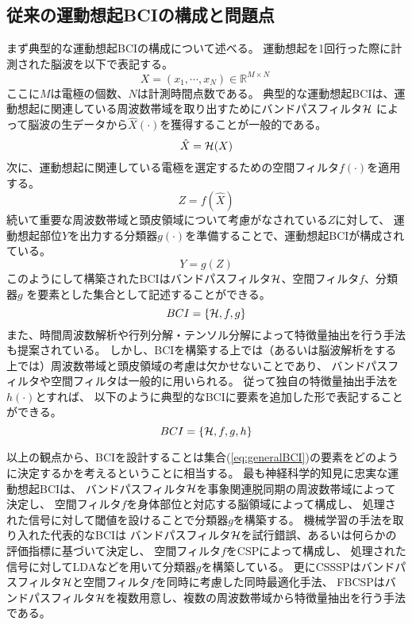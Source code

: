 \subsection{従来の運動想起BCIの構成と問題点}
まず典型的な運動想起BCIの構成について述べる。
運動想起を1回行った際に計測された脳波を以下で表記する。
\begin{equation}
    X =(x_1, \cdots, x_N)\in \mathbb{R}^{M \times N}\    
\end{equation}
ここに\(M\)は電極の個数、\(N\)は計測時間点数である。
典型的な運動想起BCIは、運動想起に関連している周波数帯域を取り出すためにバンドパスフィルタ\(\cal H\)
によって脳波の生データから\(\hat X(\cdot)\)を獲得することが一般的である。
\begin{equation}
    \hat X = {\cal H}(X)
    \label{eq:bandpass}
\end{equation}
次に、運動想起に関連している電極を選定するための空間フィルタ\(f(\cdot)\)を適用する。
\begin{equation}
    Z = f(\hat X)
    \label{eq:spatfilter}
\end{equation}
続いて重要な周波数帯域と頭皮領域について考慮がなされている\(Z\)に対して、
運動想起部位\(Y\)を出力する分類器\(g(\cdot)\)を準備することで、運動想起BCIが構成されている。
\begin{equation}
    Y = g(Z)
    \label{eq:classifier}
\end{equation}
このようにして構築されたBCIはバンドパスフィルタ\(\cal H\)、空間フィルタ\(f\)、分類器\(g\)
を要素とした集合として記述することができる。
\begin{equation}
    BCI=\{{\cal H},f,g\}
    \label{eq:BCI}
\end{equation}
また、時間周波数解析や行列分解・テンソル分解によって特徴量抽出を行う手法も提案されている。
しかし、BCIを構築する上では（あるいは脳波解析をする上では）周波数帯域と頭皮領域の考慮は欠かせないことであり、
バンドパスフィルタや空間フィルタは一般的に用いられる。
従って独自の特徴量抽出手法を\(h(\cdot)\)とすれば、
以下のように典型的なBCIに要素を追加した形で表記することができる。
\begin{equation}
    BCI=\{{\cal H},f,g,h\}
    \label{eq:generalBCI}
\end{equation}

以上の観点から、BCIを設計することは集合(\ref{eq:generalBCI})の要素をどのように決定するかを考えるということに相当する。
最も神経科学的知見に忠実な運動想起BCIは、
バンドパスフィルタ\(\cal H\)を事象関連脱同期の周波数帯域によって決定し、
空間フィルタ\(f\)を身体部位と対応する脳領域によって構成し、
処理された信号に対して閾値を設けることで分類器\(g\)を構築する。
機械学習の手法を取り入れた代表的なBCIは
バンドパスフィルタ\(\cal H\)を試行錯誤、あるいは何らかの評価指標に基づいて決定し、
空間フィルタ\(f\)をCSPによって構成し、
処理された信号に対してLDAなどを用いて分類器\(g\)を構築している。
更にCSSSPはバンドパスフィルタ\(\cal H\)と空間フィルタ\(f\)を同時に考慮した同時最適化手法、
FBCSPはバンドパスフィルタ\(\cal H\)を複数用意し、複数の周波数帯域から特徴量抽出を行う手法である。


